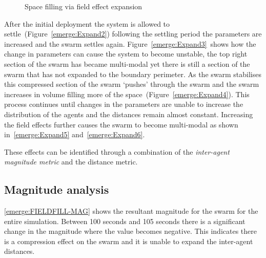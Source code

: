 \begin{figure}[H]
{	 \label{emerge:Expand5}
}
\caption{Space filling via field effect expansion}
\label{methods:ExpansionFill}
\end{figure}

After the initial deployment the system is allowed to settle~(Figure~\ref{emerge:Expand2}) following the settling period the parameters are increased and the swarm settles again. Figure~\ref{emerge:Expand3}~shows how the change in parameters can cause the system to become unstable, the top right section of the swarm has became multi-modal yet there is still a section of the swarm that has not expanded to the boundary perimeter. As the swarm stabilises this compressed section of the swarm `pushes' through the swarm and the swarm increases in volume filling more of the space~(Figure~\ref{emerge:Expand4}). This process continues until changes in the parameters are unable to increase the distribution of the agents and the distances remain almost constant. Increasing the field effects further causes the swarm to become multi-modal as shown in~\ref{emerge:Expand5} and~\ref{emerge:Expand6}.

These effects can be identified through a combination of the \textit{inter-agent magnitude metric} and the distance metric.

\subsection{Magnitude analysis}
\autoref{emerge:FIELDFILL-MAG} shows the resultant magnitude for the swarm for the entire simulation. Between 100 seconds and 105 seconds there is a significant change in the magnitude where the value becomes negative. This indicates there is a compression effect on the swarm and it is unable to expand the inter-agent distances.

